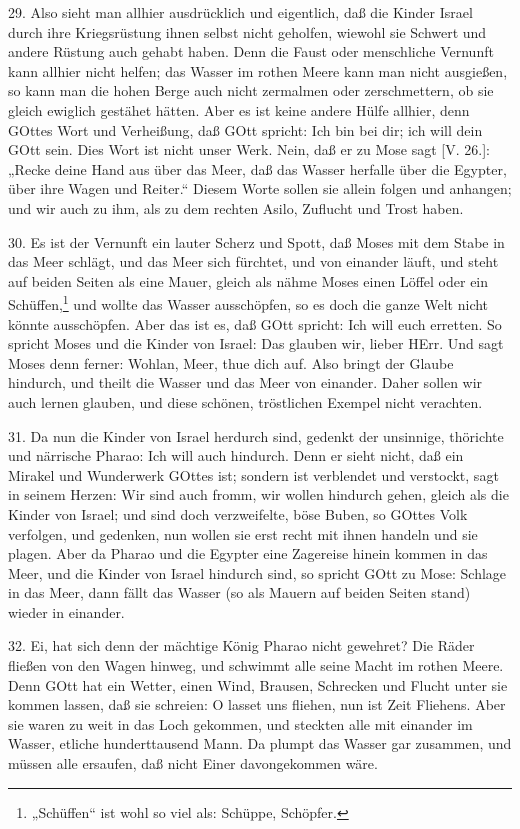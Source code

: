29. Also sieht man allhier ausdrücklich und eigentlich, daß die Kinder Israel durch ihre Kriegsrüstung ihnen selbst nicht geholfen, wiewohl sie Schwert und andere Rüstung auch gehabt haben. Denn die Faust oder menschliche Vernunft kann allhier nicht helfen; das Wasser im rothen Meere kann man nicht ausgießen, so kann man die hohen Berge auch nicht zermalmen oder zerschmettern, ob sie gleich ewiglich gestähet hätten. Aber es ist keine andere Hülfe allhier, denn GOttes Wort und Verheißung, daß GOtt spricht: Ich bin bei dir; ich will dein GOtt sein. Dies Wort ist nicht unser Werk. Nein, daß er zu Mose sagt [V. 26.]: „Recke deine Hand aus über das Meer, daß das Wasser herfalle über die Egypter, über ihre Wagen und Reiter.“ Diesem Worte sollen sie allein folgen und anhangen; und wir auch zu ihm, als zu dem rechten Asilo, Zuflucht und Trost haben.

30. Es ist der Vernunft ein lauter Scherz und Spott, daß Moses mit dem Stabe in das Meer schlägt, und das Meer sich fürchtet, und von einander läuft, und steht auf beiden Seiten als eine Mauer, gleich als nähme Moses einen Löffel oder ein Schüffen,\footnote{„Schüffen“ ist wohl so viel als: Schüppe, Schöpfer.} und wollte das Wasser ausschöpfen, so es doch die ganze Welt nicht könnte ausschöpfen. Aber das ist es, daß GOtt spricht: Ich will euch erretten. So spricht Moses und die Kinder von Israel: Das glauben wir, lieber HErr. Und sagt Moses denn ferner: Wohlan, Meer, thue dich auf. Also bringt der Glaube hindurch, und theilt die Wasser und das Meer von einander. Daher sollen wir auch lernen glauben, und diese schönen, tröstlichen Exempel nicht verachten.

31. Da nun die Kinder von Israel herdurch sind, gedenkt der unsinnige, thörichte und närrische Pharao: Ich will auch hindurch. Denn er sieht nicht, daß ein Mirakel und Wunderwerk GOttes ist; sondern ist verblendet und verstockt, sagt in seinem Herzen: Wir sind auch fromm, wir wollen hindurch gehen, gleich als die Kinder von Israel; und sind doch verzweifelte, böse Buben, so GOttes Volk verfolgen, und gedenken, nun wollen sie erst recht mit ihnen handeln und sie plagen. Aber da Pharao und die Egypter eine Zagereise hinein kommen in das Meer, und die Kinder von Israel hindurch sind, so spricht GOtt zu Mose: Schlage in das Meer, dann fällt das Wasser (so als Mauern auf beiden Seiten stand) wieder in einander.

32. Ei, hat sich denn der mächtige König Pharao nicht gewehret? Die Räder fließen von den Wagen hinweg, und schwimmt alle seine Macht im rothen Meere. Denn GOtt hat ein Wetter, einen Wind, Brausen, Schrecken und Flucht unter sie kommen lassen, daß sie schreien: O lasset uns fliehen, nun ist Zeit Fliehens. Aber sie waren zu weit in das Loch gekommen, und steckten alle mit einander im Wasser, etliche hunderttausend Mann. Da plumpt das Wasser gar zusammen, und müssen alle ersaufen, daß nicht Einer davongekommen wäre.

